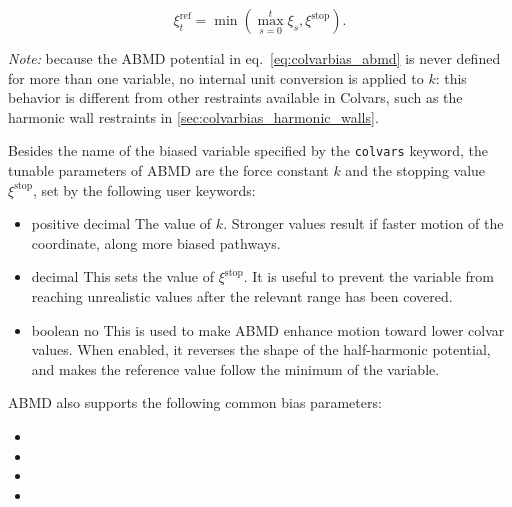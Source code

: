 \begin{equation}
  \xi^{\mathrm{ref}}_t = \min\left(\max_{s=0}^{t} \xi_s, \xi^{\mathrm{stop}}\right).
\end{equation}

\emph{Note:} because the ABMD potential in eq.\ \ref{eq:colvarbias_abmd} is never defined for more than one variable, no internal unit conversion is applied to $k$: this behavior is different from other restraints available in Colvars, such as the harmonic wall restraints in \ref{sec:colvarbias_harmonic_walls}.

Besides the name of the biased variable specified by the \texttt{colvars} keyword, the tunable parameters of ABMD are the force constant $k$ and the stopping value $\xi^{\mathrm{stop}}$, set by the following user keywords:

\begin{itemize}
  \item %
    {positive decimal}
    {The value of $k$. Stronger values result if faster motion of the coordinate, along more biased pathways.}

  \item {}
   {decimal}
   {This sets the value of $\xi^{\mathrm{stop}}$. It is useful to prevent the variable from reaching unrealistic
    values after the relevant range has been covered.}

   \item
    {boolean}
    {no}
    {This is used to make ABMD enhance motion toward lower colvar values. When enabled, it reverses the shape of the
    half-harmonic potential, and makes the reference value follow the minimum of the variable.}

\end{itemize}

ABMD also supports the following common bias parameters:
\begin{itemize}
  \item {}
  \item {}
  \item {}
  \item {}
\end{itemize}



